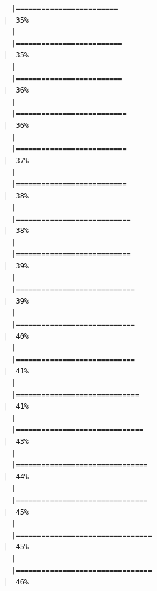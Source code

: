 \documentclass[
  letterpaper,
  DIV=11,
  numbers=noendperiod]{scrreprt}
\begin{document}
\begin{verbatim}
  |========================                                              |  35%
  |                                                                            
  |=========================                                             |  35%
  |                                                                            
  |=========================                                             |  36%
  |                                                                            
  |==========================                                            |  36%
  |                                                                            
  |==========================                                            |  37%
  |                                                                            
  |==========================                                            |  38%
  |                                                                            
  |===========================                                           |  38%
  |                                                                            
  |===========================                                           |  39%
  |                                                                            
  |============================                                          |  39%
  |                                                                            
  |============================                                          |  40%
  |                                                                            
  |============================                                          |  41%
  |                                                                            
  |=============================                                         |  41%
  |                                                                            
  |==============================                                        |  43%
  |                                                                            
  |===============================                                       |  44%
  |                                                                            
  |===============================                                       |  45%
  |                                                                            
  |================================                                      |  45%
  |                                                                            
  |================================                                      |  46%

\end{verbatim}
\end{document}
